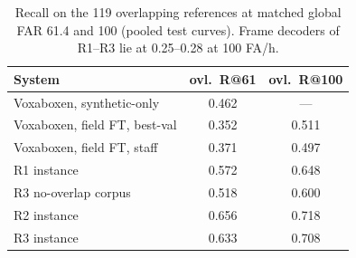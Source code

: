 \documentclass[10pt,twocolumn]{article}
\begin{document}
\begin{table}[t]
\centering\footnotesize
\caption{Recall on the 119 overlapping references at matched global FAR 61.4 and 100 (pooled test curves). Frame decoders of R1--R3 lie at 0.25--0.28 at 100 FA/h.}
\label{tab:overlapfull}
\setlength{\tabcolsep}{4pt}
\begin{tabular}{lcc}
\toprule
System & ovl.\ R@61 & ovl.\ R@100\\
\midrule
Voxaboxen, synthetic-only & 0.462 & ---\\
Voxaboxen, field FT, best-val & 0.352 & 0.511\\
Voxaboxen, field FT, staff & 0.371 & 0.497\\
R1 instance & 0.572 & 0.648\\
R3 no-overlap corpus & 0.518 & 0.600\\
R2 instance & 0.656 & 0.718\\
R3 instance & 0.633 & 0.708\\
\bottomrule
\end{tabular}
\end{table}
\end{document}
